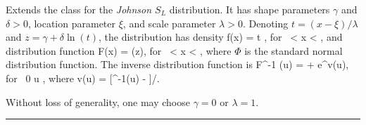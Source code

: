 
Extends the class  for
the {\em Johnson $S_L$\/} distribution.
It  has shape parameters $\gamma$ and $\delta > 0$, location parameter
$\xi$, and scale parameter $\lambda > 0$.
Denoting $t=(x-\xi)/\lambda$ and $z = \gamma + \delta\ln(t)$,
the distribution has density
%
\eq
 f(x) =
 {\lambda t \sqrt{2\pi}} \html{)},
 \qquad  \mbox{for } \xi < x < \infty,
\endeq
%
and distribution function
\eq
 F(x) = \Phi(z), \qquad  \mbox{for } \xi < x < \infty,
\endeq
where $\Phi$ is the standard normal distribution function.
The inverse distribution function is
\eq
 F^{-1} (u) = \xi + \lambda e^{v(u)},  \qquad\mbox{for }  0 \le u ,
\endeq
where
\eq
  v(u) = [\Phi^{-1}(u) - \gamma]/\delta.
\endeq

Without loss of generality, one may choose $\gamma = 0$ or $\lambda=1$.


\bigskip\hrule

